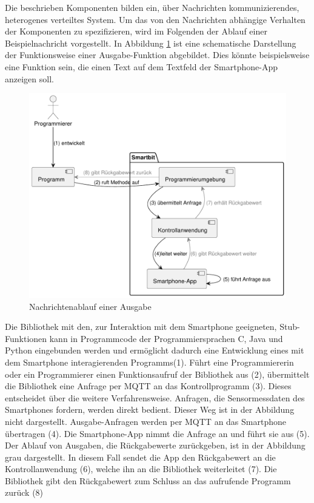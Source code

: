 \documentclass[11pt,a4paper]{report}
\begin{document}
Die beschrieben Komponenten bilden ein, über Nachrichten kommunizierendes, heterogenes verteiltes System.
Um das von den Nachrichten abhängige Verhalten der Komponenten zu spezifizieren, wird im Folgenden der Ablauf einer Beispielnachricht vorgestellt.
In Abbildung \ref{fig:arch_flow} ist eine schematische Darstellung der Funktionsweise einer Ausgabe-Funktion abgebildet.
Dies könnte beispielsweise eine Funktion sein, die einen Text auf dem Textfeld der Smartphone-App anzeigen soll.
\begin{figure}[htbp]
  \centering
  \includegraphics[width=\textwidth]{images/arch_call_flow.pdf}
  \caption{Nachrichtenablauf einer Ausgabe}
  \label{fig:arch_flow}
\end{figure}
Die Bibliothek mit den, zur Interaktion mit dem Smartphone geeigneten, Stub-Funktionen kann in Programmcode der Programmiersprachen C, Java und Python eingebunden werden und ermöglicht dadurch eine Entwicklung eines mit dem Smartphone interagierenden Programms(1).
Führt eine Programmiererin oder ein Programmierer einen Funktionsaufruf der Bibliothek aus (2), übermittelt die Bibliothek eine Anfrage per MQTT an das Kontrollprogramm (3).
Dieses entscheidet über die weitere Verfahrensweise.
Anfragen, die Sensormessdaten des Smartphones fordern, werden direkt bedient.
Dieser Weg ist in der Abbildung nicht dargestellt.
Ausgabe-Anfragen werden per MQTT an das Smartphone übertragen (4).
Die Smartphone-App nimmt die Anfrage an und führt sie aus (5).
Der Ablauf von Ausgaben, die Rückgabewerte zurückgeben, ist in der Abbildung grau dargestellt.
In diesem Fall sendet die App den Rückgabewert an die Kontrollanwendung (6), welche ihn an die Bibliothek weiterleitet (7).
Die Bibliothek gibt den Rückgabewert zum Schluss an das aufrufende Programm zurück (8)
\end{document}
